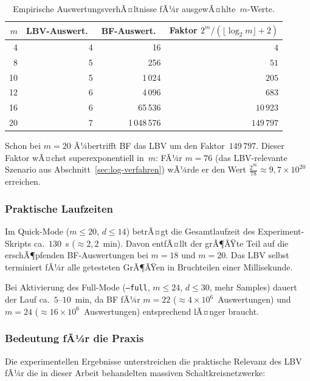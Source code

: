 ﻿\documentclass[a4paper,12pt]{article}
\theoremstyle{definition}
\begin{document}
\begin{table}[h]
  \centering
  \begin{tabular}{rrrr}
    \toprule
    $m$ & LBV-Auswert.\ & BF-Auswert.\ & Faktor $2^m / (\lfloor\log_2 m\rfloor+2)$ \\
    \midrule
    4  & 4 & 16        & ~~~~~~~~~$4$ \\
    8  & 5 & 256       & ~~~~~~~~~~~~~~$51$ \\
    10 & 5 & 1\,024    & ~~~~~~~~~~~~~$205$ \\
    12 & 6 & 4\,096    & ~~~~~~~~~~~~~$683$ \\
    16 & 6 & 65\,536   & ~~~~~~~~~~$10\,923$ \\
    20 & 7 & 1\,048\,576 & ~~~~~~~$149\,797$ \\
    \bottomrule
  \end{tabular}
  \caption{Empirische AuswertungsverhÃ¤ltnisse fÃ¼r ausgewÃ¤hlte~$m$-Werte.}
  \label{tab:exp-faktoren}
\end{table}

Schon bei $m = 20$ Ã¼bertrifft BF das LBV um den Faktor~$149\,797$.  Dieser Faktor
wÃ¤chst superexponentiell in~$m$: FÃ¼r $m = 76$ (das LBV-relevante Szenario aus
Abschnitt~\ref{sec:log-verfahren}) wÃ¼rde er den Wert
$\frac{2^{76}}{78} \approx 9{,}7 \times 10^{20}$ erreichen.

\subsubsection{Praktische Laufzeiten}

Im Quick-Mode ($m \leq 20$, $d \leq 14$) betrÃ¤gt die Gesamtlaufzeit des Experiment-Skripts
ca.\ $130$~s ($\approx 2{,}2$~min).  Davon entfÃ¤llt der grÃ¶ÃŸte Teil auf die erschÃ¶pfenden
BF-Auswertungen bei $m = 18$ und $m = 20$.  Das LBV selbst terminiert fÃ¼r alle getesteten
GrÃ¶ÃŸen in Bruchteilen einer Millisekunde.

Bei Aktivierung des Full-Mode (\texttt{--full}, $m \leq 24$, $d \leq 30$, mehr Samples)
dauert der Lauf ca.\ $5$--$10$~min, da BF fÃ¼r $m = 22$ ($\approx 4 \times 10^6$~Aus\-wertungen)
und $m = 24$ ($\approx 16 \times 10^6$~Auswertungen) entsprechend lÃ¤nger braucht.

\subsubsection{Bedeutung fÃ¼r die Praxis}

Die experimentellen Ergebnisse unterstreichen die praktische Relevanz des LBV fÃ¼r
die in dieser Arbeit behandelten massiven Schaltkreisnetzwerke:
\end{document}
